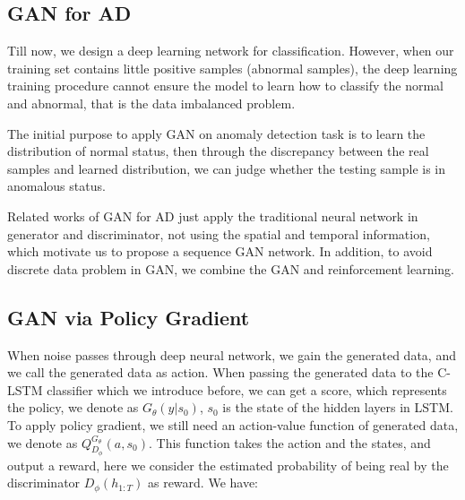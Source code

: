 \documentclass{acmtog} %
\begin{document}
\begin{table}[h]
\end{table}

\subsection{GAN for AD}
Till now, we design a deep learning network for classification. However, when our training set contains little positive samples (abnormal samples), the deep learning training procedure cannot ensure the model to learn how to classify the normal and abnormal, that is the data imbalanced problem.

The initial purpose to apply GAN on anomaly detection task is to learn the distribution of normal status, then through the discrepancy between the real samples and learned distribution, we can judge whether the testing sample is in anomalous status.

Related works of GAN for AD just apply the traditional neural network in generator and discriminator, not using the spatial and temporal information, which motivate us to propose a sequence GAN network. In addition, to avoid discrete data problem in GAN, we combine the GAN and reinforcement learning.

\subsection{GAN via Policy Gradient}
When noise passes through deep neural network, we gain the generated data, and we call the generated data as action. When passing the generated data to the C-LSTM classifier which we introduce before, we can get a score, which represents the policy, we denote as $G_{\theta}(y|s_{0} )$, $s_{0}$ is the state of the hidden layers in LSTM. To apply policy gradient, we still need an action-value function of generated data, we denote as $Q_{D_{\phi}}^{G_{\theta}}(a,s_{0})$. This function takes the action and the states, and output a reward, here we consider the estimated probability of being real by the discriminator $D_{\phi}(h_{1:T})$ as reward. We have:
\end{document}
